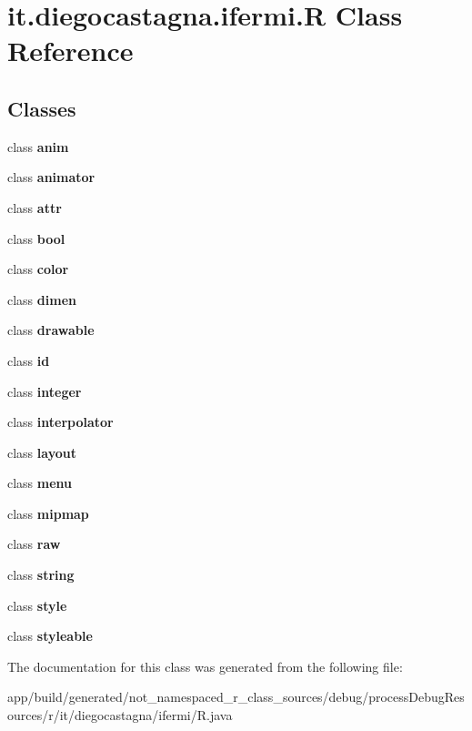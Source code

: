 \hypertarget{classit_1_1diegocastagna_1_1ifermi_1_1_r}{}\section{it.\+diegocastagna.\+ifermi.\+R Class Reference}
\label{classit_1_1diegocastagna_1_1ifermi_1_1_r}
\subsection*{Classes}
\begin{DoxyCompactItemize}
\item 
class {\bfseries anim}
\item 
class {\bfseries animator}
\item 
class {\bfseries attr}
\item 
class {\bfseries bool}
\item 
class {\bfseries color}
\item 
class {\bfseries dimen}
\item 
class {\bfseries drawable}
\item 
class {\bfseries id}
\item 
class {\bfseries integer}
\item 
class {\bfseries interpolator}
\item 
class {\bfseries layout}
\item 
class {\bfseries menu}
\item 
class {\bfseries mipmap}
\item 
class {\bfseries raw}
\item 
class {\bfseries string}
\item 
class {\bfseries style}
\item 
class {\bfseries styleable}
\end{DoxyCompactItemize}


The documentation for this class was generated from the following file\+:\begin{DoxyCompactItemize}
\item 
app/build/generated/not\+\_\+namespaced\+\_\+r\+\_\+class\+\_\+sources/debug/process\+Debug\+Resources/r/it/diegocastagna/ifermi/R.\+java\end{DoxyCompactItemize}
